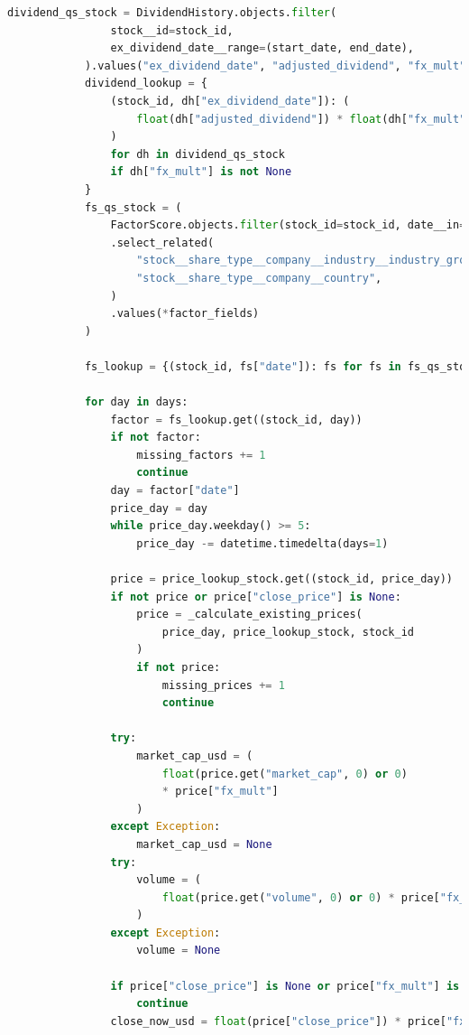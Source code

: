 \documentclass[11pt,english,a4paper,hidelinks]{book}
\begin{document}
\begin{lstlisting}[language=Python, caption=Data Export Job Implementation]
            dividend_qs_stock = DividendHistory.objects.filter(
                stock__id=stock_id,
                ex_dividend_date__range=(start_date, end_date),
            ).values("ex_dividend_date", "adjusted_dividend", "fx_mult")
            dividend_lookup = {
                (stock_id, dh["ex_dividend_date"]): (
                    float(dh["adjusted_dividend"]) * float(dh["fx_mult"])
                )
                for dh in dividend_qs_stock
                if dh["fx_mult"] is not None
            }
            fs_qs_stock = (
                FactorScore.objects.filter(stock_id=stock_id, date__in=days)
                .select_related(
                    "stock__share_type__company__industry__industry_group__sector",
                    "stock__share_type__company__country",
                )
                .values(*factor_fields)
            )

            fs_lookup = {(stock_id, fs["date"]): fs for fs in fs_qs_stock}

            for day in days:
                factor = fs_lookup.get((stock_id, day))
                if not factor:
                    missing_factors += 1
                    continue
                day = factor["date"]
                price_day = day
                while price_day.weekday() >= 5:
                    price_day -= datetime.timedelta(days=1)

                price = price_lookup_stock.get((stock_id, price_day))
                if not price or price["close_price"] is None:
                    price = _calculate_existing_prices(
                        price_day, price_lookup_stock, stock_id
                    )
                    if not price:
                        missing_prices += 1
                        continue

                try:
                    market_cap_usd = (
                        float(price.get("market_cap", 0) or 0)
                        * price["fx_mult"]
                    )
                except Exception:
                    market_cap_usd = None
                try:
                    volume = (
                        float(price.get("volume", 0) or 0) * price["fx_mult"]
                    )
                except Exception:
                    volume = None

                if price["close_price"] is None or price["fx_mult"] is None:
                    continue
                close_now_usd = float(price["close_price"]) * price["fx_mult"]


\end{lstlisting}
\end{document}
